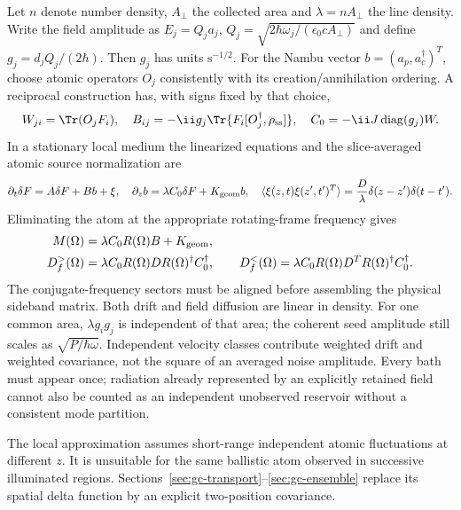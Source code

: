 Let $n$ denote number density, $A_\perp$ the collected area and
$\lambda=nA_\perp$ the line density. Write the field amplitude as
$E_j=Q_ja_j$, $Q_j=\sqrt{2\hbar\omega_j/(\epsilon_0cA_\perp)}$ and define
$g_j=d_jQ_j/(2\hbar)$. Then $g_j$ has units $\mathrm{s}^{-1/2}$.
For the Nambu vector $b=(a_p,a_c^\dagger)^T$, choose atomic operators $O_j$
consistently with its creation/annihilation ordering. A reciprocal construction
has, with signs fixed by that choice,
\begin{equation}
 W_{ji}=\Tr(O_jF_i),\quad
 B_{ij}=-\ii g_j\Tr\{F_i[O_j^\dagger,\rho_{\rm ss}]\},\quad
 C_0=-\ii J\operatorname{diag}(g_j)W.
 \label{eq:gc-reciprocal-couplings}
\end{equation}
In a stationary local medium the linearized equations and the slice-averaged
atomic source normalization are
\begin{equation}
 \partial_t\delta F=A\delta F+Bb+\xi,\quad
 \partial_zb=\lambda C_0\delta F+K_{\rm geom}b,\quad
 \langle\xi(z,t)\xi(z',t')^T\rangle
 =\frac{D}{\lambda}\delta(z-z')\delta(t-t').
 \label{eq:gc-local-equations}
\end{equation}
Eliminating the atom at the appropriate rotating-frame frequency gives
\begin{align}
 M(\Omega)&=\lambda C_0R(\Omega)B+K_{\rm geom},\label{eq:gc-field-drift}\\
 D_f^>(\Omega)&=\lambda C_0R(\Omega)DR(\Omega)^\dagger C_0^\dagger,
 \qquad
 D_f^<(\Omega)=\lambda C_0R(\Omega)D^TR(\Omega)^\dagger C_0^\dagger.
 \label{eq:gc-field-diffusion}
\end{align}
The conjugate-frequency sectors must be aligned before assembling the physical
sideband matrix. Both drift and field diffusion are linear in density. For
one common area, $\lambda g_ig_j$ is independent of that area; the coherent
seed amplitude still scales as $\sqrt{P/\hbar\omega}$. Independent velocity
classes contribute weighted drift and weighted covariance, not the square of
an averaged noise amplitude. Every bath must appear once; radiation already
represented by an explicitly retained field cannot also be counted as an
independent unobserved reservoir without a consistent mode partition.

The local approximation assumes short-range independent atomic fluctuations
at different $z$. It is unsuitable for the same ballistic atom observed in
successive illuminated regions. Sections~\ref{sec:gc-transport}--\ref{sec:gc-ensemble}
replace its spatial delta function by an explicit two-position covariance.

